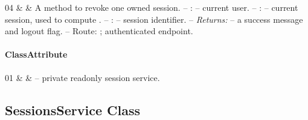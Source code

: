 \begin{ClassMethodTable}
04 & \newline{} &
A method to revoke one owned session.
\newline -- :  -- current user.
\newline -- :  -- current session, used to compute .
\newline -- :  -- session identifier.
\newline -- \textit{Returns:}  -- a success message and logout flag.
\newline -- Route: ; authenticated endpoint. \\ \hline
\end{ClassMethodTable}

\paragraph{ClassAttribute}
\begin{ClassAttributeTable}
01 &  &  -- private readonly session service. \\ \hline
\end{ClassAttributeTable}

\subsection{SessionsService Class}

